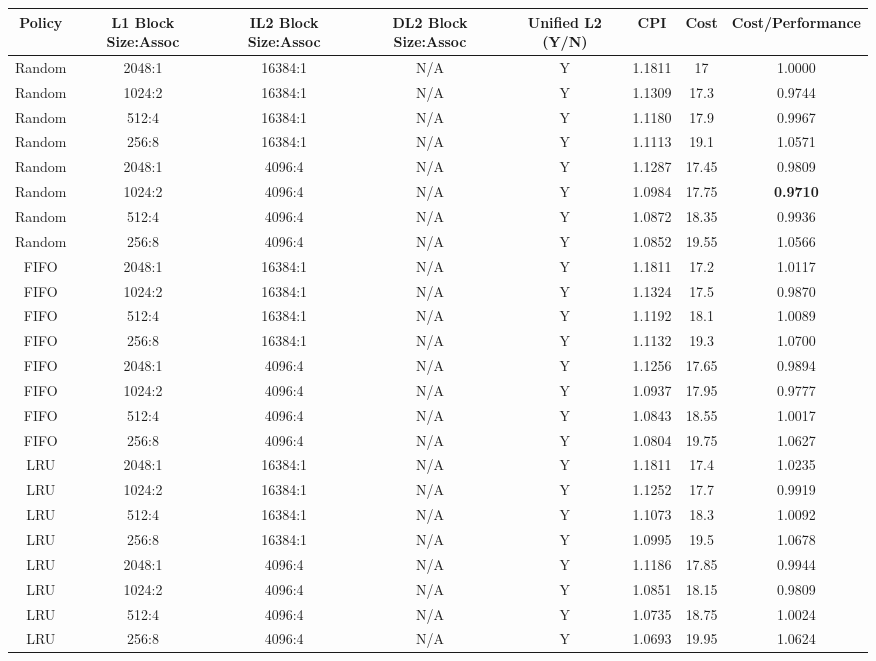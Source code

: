 \documentclass[twocolumn]{article}
\begin{document}
\begingroup
    \medskip
    \centering
    \def\arraystretch{1.5}
        \scriptsize{
        \begin{tabular}{cccccccc}
            \toprule
            Policy & L1 Block Size:Assoc & IL2 Block Size:Assoc & DL2 Block Size:Assoc & Unified L2 (Y/N) & CPI & Cost & Cost/Performance\\
            \midrule
            Random & 2048:1 & 16384:1 & N/A & Y & 1.1811 & 17   & 1.0000\\
            Random & 1024:2 & 16384:1 & N/A & Y & 1.1309 & 17.3 & 0.9744\\
            Random & 512:4 & 16384:1 & N/A & Y  & 1.1180 & 17.9 & 0.9967 \\
            Random & 256:8 & 16384:1 & N/A & Y  & 1.1113 & 19.1 & 1.0571\\
            \midrule
            Random & 2048:1 & 4096:4 & N/A & Y & 1.1287 & 17.45 & 0.9809\\
            Random & 1024:2 & 4096:4 & N/A & Y & 1.0984& 17.75  & \textbf{0.9710}\\
            Random & 512:4 & 4096:4 & N/A & Y & 1.0872& 18.35   & 0.9936\\
            Random & 256:8 & 4096:4 & N/A & Y & 1.0852& 19.55   & 1.0566\\
            \midrule
            FIFO & 2048:1 & 16384:1 & N/A & Y & 1.1811 & 17.2 & 1.0117\\
            FIFO & 1024:2 & 16384:1 & N/A & Y & 1.1324 & 17.5 & 0.9870\\
            FIFO & 512:4 & 16384:1 & N/A & Y & 1.1192 & 18.1 & 1.0089\\
            FIFO & 256:8 & 16384:1 & N/A & Y & 1.1132 & 19.3 & 1.0700\\
            \midrule
            FIFO & 2048:1 & 4096:4 & N/A & Y & 1.1256 & 17.65 & 0.9894\\
            FIFO & 1024:2 & 4096:4 & N/A & Y & 1.0937 & 17.95 & 0.9777\\
            FIFO & 512:4 & 4096:4 & N/A & Y & 1.0843 & 18.55  & 1.0017\\
            FIFO & 256:8 & 4096:4 & N/A & Y & 1.0804 & 19.75  & 1.0627\\
            \midrule
            LRU & 2048:1 & 16384:1 & N/A & Y & 1.1811 & 17.4 & 1.0235\\
            LRU & 1024:2 & 16384:1 & N/A & Y & 1.1252& 17.7 & 0.9919\\
            LRU & 512:4 & 16384:1 & N/A &  Y & 1.1073& 18.3   & 1.0092\\
            LRU & 256:8 & 16384:1 & N/A &  Y & 1.0995 & 19.5 & 1.0678\\
            \midrule
            LRU & 2048:1 & 4096:4 & N/A & Y & 1.1186& 17.85 & 0.9944\\
            LRU & 1024:2 & 4096:4 & N/A & Y & 1.0851& 18.15 & 0.9809\\
            LRU & 512:4 & 4096:4 & N/A &  Y & 1.0735& 18.75 & 1.0024\\
            LRU & 256:8 & 4096:4 & N/A &  Y & 1.0693& 19.95 & 1.0624\\
             
            \bottomrule
        \end{tabular}
        }
\end{document}
